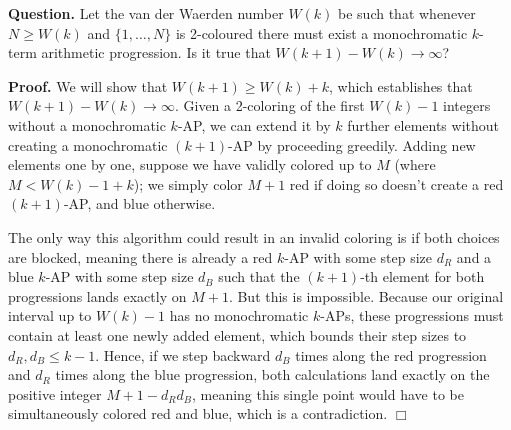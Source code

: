 
\noindent \textbf{Question.} Let the van der Waerden number $W(k)$
 be such that whenever $N\geq W(k)$
 and $\{1,\ldots,N\}$
 is 2-coloured there must exist a monochromatic $k$-term arithmetic progression.  Is it true that $W(k+1)-W(k)\rightarrow\infty$?
 
\noindent \textbf{Proof.} We will show that $W(k+1) \geq W(k) + k$, which establishes that $W(k+1)-W(k)\rightarrow\infty$. Given a 2-coloring of the first $W(k)-1$ integers without a monochromatic $k$-AP, we can extend it by $k$ further elements without creating a monochromatic $(k+1)$-AP by proceeding greedily. Adding new elements one by one, suppose we have validly colored up to $M$ (where $M < W(k)-1+k$); we simply color $M+1$ red if doing so doesn't create a red $(k+1)$-AP, and blue otherwise. 
        
        The only way this algorithm could result in an invalid coloring is if both choices are blocked, meaning there is already a red $k$-AP with some step size $d_R$ and a blue $k$-AP with some step size $d_B$ such that the $(k+1)$-th element for both progressions lands exactly on $M+1$. But this is impossible. Because our original interval up to $W(k)-1$ has no monochromatic $k$-APs, these progressions must contain at least one newly added element, which bounds their step sizes to $d_R, d_B \le k-1$. Hence, if we step backward $d_B$ times along the red progression and $d_R$ times along the blue progression, both calculations land exactly on the positive integer $M + 1 - d_R d_B$, meaning this single point would have to be simultaneously colored red and blue, which is a contradiction. \hfill $\Box$
